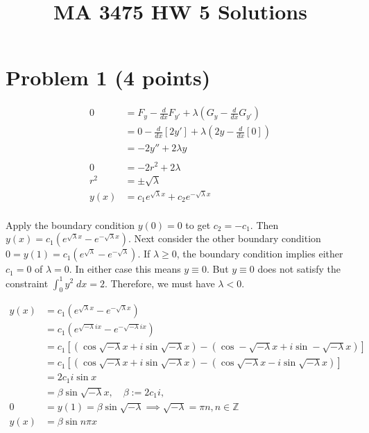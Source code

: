 \documentclass[a4paper]{article}
\title{MA 3475 HW 5 Solutions}
\begin{document}
\maketitle


\section*{Problem 1 (4 points)}

\begin{align*}
0 &= F_y - \frac{d}{dx}F_{y'} + \lambda (G_y - \frac{d}{dx}G_{y'}) \\
&= 0 - \frac{d}{dx}[2y'] + \lambda(2y - \frac{d}{dx}[0])\\
&= - 2y'' + 2\lambda y \\
& \\
0 &= -2r^2 + 2\lambda \\
r^2 &= \pm \sqrt{\lambda} \\
y(x) &= c_1e^{\sqrt{\lambda}x} + c_2 e^{-\sqrt{\lambda} x} \\
\end{align*}

Apply the boundary condition $y(0) = 0$ to get $c_2 = -c_1$. Then $y(x) = c_1(e^{\sqrt{\lambda}x} - e^{-\sqrt{\lambda}x})$. Next consider the other boundary condition $0 = y(1) = c_1(e^{\sqrt{\lambda}} - e^{-\sqrt{\lambda}})$. If $\lambda \geq 0$, the boundary condition implies either $c_1 = 0$ of $\lambda = 0$. In either case this means $y \equiv 0$. But $y \equiv 0$ does not satisfy the constraint $\int_0^1 y^2 \; dx = 2$. Therefore, we must have $\lambda < 0$.

\begin{align*}
y(x) &= c_1\left(e^{\sqrt{\lambda}x} -  e^{-\sqrt{\lambda} x} \right)\\
&= c_1\left(e^{\sqrt{-\lambda}i x} - e^{-\sqrt{-\lambda} i x}\right) \\
&= c_1\left[ (\cos \sqrt{-\lambda} x + i \sin \sqrt{-\lambda} x) - (\cos -\sqrt{-\lambda} x + i \sin -\sqrt{-\lambda} x)\right] \\
&= c_1\left[ (\cos \sqrt{-\lambda} x + i \sin \sqrt{-\lambda} x) - (\cos \sqrt{-\lambda} x - i \sin \sqrt{-\lambda} x)\right] \\
&= 2c_1 i \sin x\\
&= \beta \sin \sqrt{-\lambda} x, \quad \beta := 2 c_1 i, \\
0 &= y(1) = \beta \sin \sqrt{-\lambda} \implies \sqrt{-\lambda} = \pi n, n \in \mathbb{Z} \\
y(x) &= \beta \sin n\pi x
\end{align*}
\end{document}
